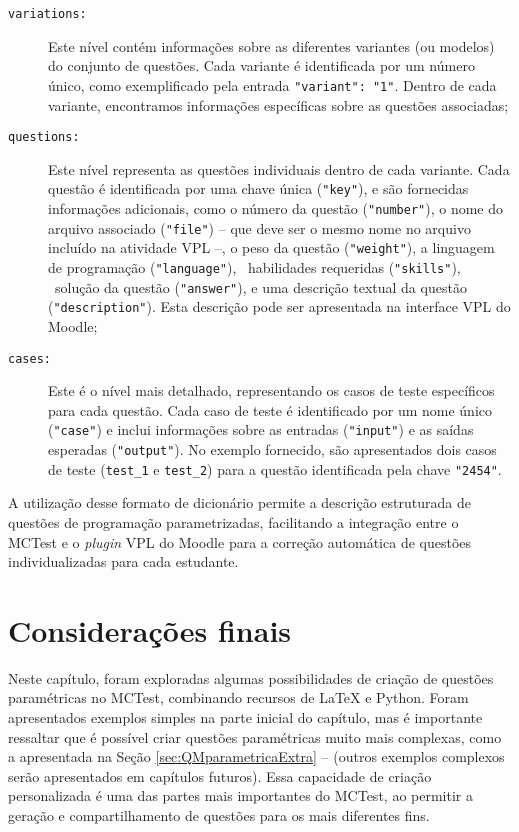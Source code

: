 \begin{description}
\item[\texttt{variations:}]  Este nível contém informações sobre as diferentes variantes (ou modelos) do conjunto de questões. Cada variante é identificada por um número único, como exemplificado pela entrada \verb|"variant": "1"|. Dentro de cada variante, encontramos informações específicas sobre as questões associadas;

\item[\texttt{questions:}] Este nível representa as questões individuais dentro de cada variante. Cada questão é identificada por uma chave única (\verb|"key"|), e são fornecidas informações adicionais, como o número da questão (\verb|"number"|), o nome do arquivo associado (\verb|"file"|) -- que deve ser o mesmo nome no arquivo incluído na atividade VPL --, o peso da questão (\verb|"weight"|), a linguagem de programação (\verb|"language"|), \ habilidades requeridas (\verb|"skills"|), \ solução da questão (\verb|"answer"|), e uma descrição textual da questão (\verb|"description"|). Esta descrição pode ser apresentada na interface VPL do Moodle;

\item[\texttt{cases:}] Este é o nível mais detalhado, representando os casos de teste específicos para cada questão. Cada caso de teste é identificado por um nome único (\verb|"case"|) e inclui informações sobre as entradas (\verb|"input"|) e as saídas esperadas (\verb|"output"|). No exemplo fornecido, são apresentados dois casos de teste (\verb|test_1| e \verb|test_2|) para a questão identificada pela chave \verb|"2454"|.
\end{description}

A utilização desse formato de dicionário permite a descrição estruturada de questões de programação parametrizadas, facilitando a integração entre o MCTest e o \textit{plugin} VPL do Moodle para a correção automática de questões individualizadas para cada estudante.

\section{Considerações finais}

Neste capítulo, foram exploradas algumas possibilidades de criação de questões paramétricas no MCTest, combinando recursos de \LaTeX{} e Python. Foram apresentados exemplos simples na parte inicial do capítulo, mas é importante ressaltar que é possível criar questões paramétricas muito mais complexas, como a apresentada na Seção \ref{sec:QMparametricaExtra} --  (outros exemplos complexos serão apresentados em capítulos futuros). Essa capacidade de criação personalizada é uma das partes mais importantes do MCTest, ao permitir a geração e compartilhamento de questões para os mais diferentes fins.


